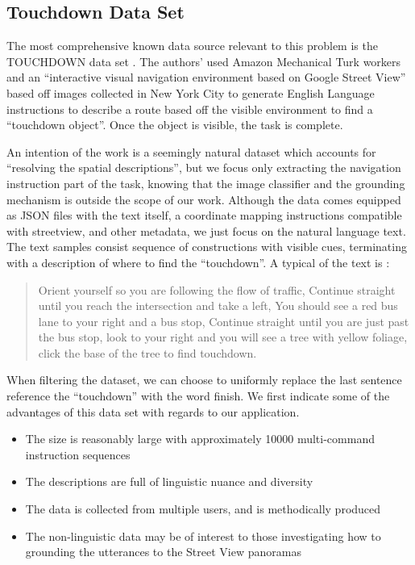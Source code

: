 \documentclass{article}
\begin{document}
\subsection{Touchdown Data Set}

The most comprehensive known data source relevant to this problem is the
TOUCHDOWN data set \cite{chen2019touchdown}. The authors' used Amazon Mechanical
Turk workers and an ``interactive visual navigation environment based on Google
Street View'' based off images collected in New York City to generate English
Language instructions to describe a route based off the visible environment to
find a ``touchdown object''. Once the object is visible, the task is complete.

An intention of the work is a seemingly natural dataset which accounts for
``resolving the spatial descriptions'', but we focus only extracting the
navigation instruction part of the task, knowing that the image classifier and
the grounding mechanism is outside the scope of our work. Although the data
comes equipped as JSON files with the text itself, a coordinate mapping
instructions compatible with streetview, and other metadata, we just focus on
the natural language text. The text samples consist sequence of constructions with
visible cues, terminating with a description of where to find the ``touchdown''.
A typical of the text is :

\begin{quote}
Orient yourself so you are following the flow of traffic, Continue straight
until you reach the intersection and take a left, You should see a red bus lane
to your right and a bus stop, Continue straight until you are just past the bus
stop, look to your right and you will see a tree with yellow foliage, click the base of the tree to find touchdown.
\end{quote}

When filtering the dataset, we can choose to uniformly replace the last sentence
reference the ``touchdown'' with the word finish. We first indicate some of the
advantages of this data set with regards to our application.

\begin{itemize}
\item The size is reasonably large with approximately 10000 multi-command instruction sequences
\item The descriptions are full of linguistic nuance and diversity
\item The data is collected from multiple users, and is methodically produced
\item The non-linguistic data may be of interest to those investigating
how to grounding the utterances to the Street View panoramas
\end{itemize}
\end{document}
